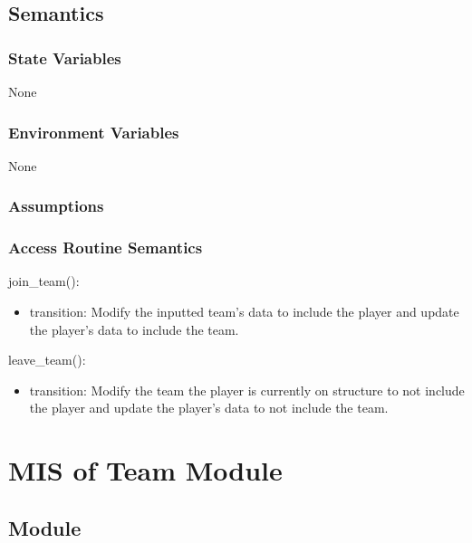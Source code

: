 \documentclass[12pt, titlepage]{article}
\begin{document}
\subsection{Semantics}

\subsubsection{State Variables}

None

\subsubsection{Environment Variables}

None

\subsubsection{Assumptions}


\subsubsection{Access Routine Semantics}

\noindent join\_team():
\begin{itemize}
\item transition: Modify the inputted team's data to include the player and
update the player's data to include the team.
\end{itemize}

\noindent leave\_team():
\begin{itemize}
\item transition: Modify the team the player is currently on structure to not
include the player and update the player's data to not include the team.
\end{itemize}

\newpage

\section{MIS of Team Module} \label{mTE}

\subsection{Module}
\end{document}
